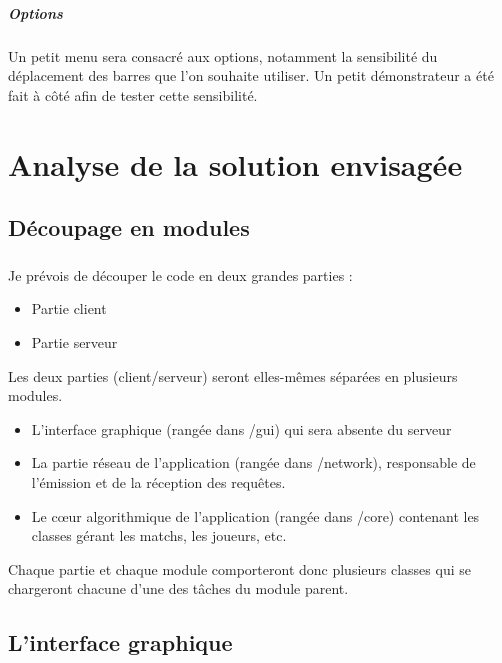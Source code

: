 \documentclass[a4paper,12pt]{report}
\begin{document}
\paragraph{Options}
Un petit menu sera consacré aux options, notamment la sensibilité du déplacement des barres que l'on souhaite utiliser. Un petit démonstrateur a été fait à côté afin de tester cette sensibilité.


\chapter{Analyse de la solution envisagée}


\section{Découpage en modules}
\paragraph{}
Je prévois de découper le code en deux grandes parties :
\begin{itemize}
    \item Partie client
    \item Partie serveur
\end{itemize}
Les deux parties (client/serveur) seront elles-mêmes séparées en plusieurs modules.
\begin{itemize}
    \item L'interface graphique (rangée dans /gui) qui sera absente du serveur
    \item La partie réseau de l'application (rangée dans /network), responsable de l'émission et de la réception des requêtes.
    \item Le c\oe{}ur algorithmique de l'application (rangée dans /core) contenant les classes gérant les matchs, les joueurs, etc.
\end{itemize}
Chaque partie et chaque module comporteront donc plusieurs classes qui se chargeront chacune d'une des tâches du module parent.


\section{L'interface graphique}
\end{document}
